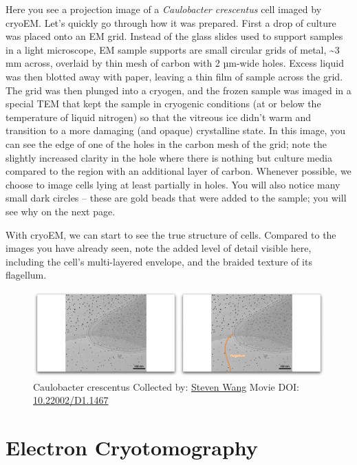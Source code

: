 \documentclass[]{tufte-book}
\begin{document}
Here you see a projection image of a \emph{Caulobacter crescentus} cell
imaged by cryoEM. Let's quickly go through how it was prepared. First a
drop of culture was placed onto an EM grid. Instead of the glass slides
used to support samples in a light microscope, EM sample supports are
small circular grids of metal, \textasciitilde{}3 mm across, overlaid by
thin mesh of carbon with 2 µm-wide holes. Excess liquid was then blotted
away with paper, leaving a thin film of sample across the grid. The grid
was then plunged into a cryogen, and the frozen sample was imaged in a
special TEM that kept the sample in cryogenic conditions (at or below
the temperature of liquid nitrogen) so that the vitreous ice didn't warm
and transition to a more damaging (and opaque) crystalline state. In
this image, you can see the edge of one of the holes in the carbon mesh
of the grid; note the slightly increased clarity in the hole where there
is nothing but culture media compared to the region with an additional
layer of carbon. Whenever possible, we choose to image cells lying at
least partially in holes. You will also notice many small dark circles
-- these are gold beads that were added to the sample; you will see why
on the next page.

With cryoEM, we can start to see the true structure of cells. Compared
to the images you have already seen, note the added level of detail
visible here, including the cell's multi-layered envelope, and the
braided texture of its flagellum.





\begin{figure}
\includegraphics{movie_stills/1_5} \caption[Caulobacter crescentus Collected by:
\protect\hyperlink{steven_wang}{Steven Wang} Movie DOI:
\href{https://doi.org/10.22002/D1.1467}{10.22002/D1.1467}]{Caulobacter crescentus Collected by:
\protect\hyperlink{steven_wang}{Steven Wang} Movie DOI:
\href{https://doi.org/10.22002/D1.1467}{10.22002/D1.1467}}\label{fig:1-5}
\end{figure}

\section{Electron Cryotomography}\label{electron-cryotomography}
\end{document}

